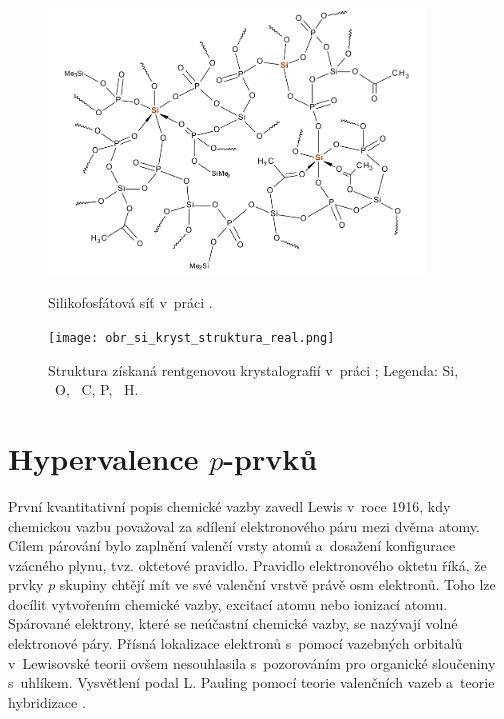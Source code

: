\documentclass[
digital, %
table,   %
lof,     %
lot,     %
oneside,
]{fithesis3}
\begin{document}
\begin{figure}
\caption{Silikofosfátová síť v~práci \cite{Styskalik2015thesis}.}\includegraphics[width=10cm]{si_polymer_cely.png}
\label{si_polymer_cely}\end{figure}
\begin{figure}
\caption{Struktura získaná rentgenovou krystalografií v~práci \cite{C3NJ00721A};  Legenda:  Si, ~O, ~C,  P, ~H. }
\center \texttt{[image: obr\_si\_kryst\_struktura\_real.png]} \label{rtg_koordinace_sest} \end{figure}

\section{Hypervalence $p$-prvků}
První kvantitativní popis chemické vazby zavedl Lewis v~roce 1916, kdy chemickou vazbu považoval za sdílení elektronového páru mezi dvěma atomy. Cílem párování bylo zaplnění valenčí vrsty atomů a~dosažení konfigurace vzácného plynu, tvz. oktetové pravidlo. Pravidlo elektronového oktetu říká, že  prvky $p$ skupiny chtějí mít ve své valenční vrstvě právě osm elektronů. Toho lze docílit vytvořením chemické vazby, excitací atomu nebo ionizací atomu. Spárované elektrony, které se neúčastní chemické vazby, se nazývají volné elektronové páry. Přísná lokalizace elektronů s~pomocí vazebných orbitalů v~Lewisovské teorii ovšem nesouhlasila s~pozorováním pro organické sloučeniny s~uhlíkem. Vysvětlení podal L. Pauling pomocí teorie valenčních vazeb a~teorie hybridizace \cite{Munzarova1996thesis}.\\
\end{document}
